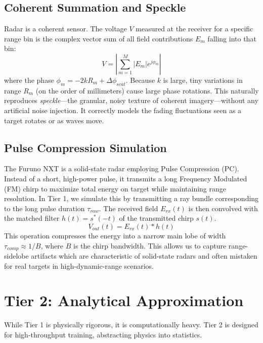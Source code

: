 \documentclass[conf]{new-aiaa}
\begin{document}
\subsection{Coherent Summation and Speckle}
Radar is a coherent sensor. The voltage $V$ measured at the receiver for a specific range bin is the complex vector sum of all field contributions $E_m$ falling into that bin:
\begin{equation}
    V = \left| \sum_{m=1}^{M} |E_m| e^{j \phi_m} \right|
\end{equation}
where the phase $\phi_m = -2 k R_m + \Delta \phi_{scat}$.
Because $k$ is large, tiny variations in range $R_m$ (on the order of millimeters) cause large phase rotations. This naturally reproduces \textit{speckle}—the granular, noisy texture of coherent imagery—without any artificial noise injection. It correctly models the fading fluctuations seen as a target rotates or as waves move.

\subsection{Pulse Compression Simulation}
The Furuno NXT is a solid-state radar employing Pulse Compression (PC). Instead of a short, high-power pulse, it transmits a long Frequency Modulated (FM) chirp to maximize total energy on target while maintaining range resolution. In Tier 1, we simulate this by transmitting a ray bundle corresponding to the long pulse duration $\tau_{raw}$. The received field $E_{rx}(t)$ is then convolved with the matched filter $h(t) = s^*(-t)$ of the transmitted chirp $s(t)$.
\begin{equation}
    V_{out}(t) = E_{rx}(t) * h(t)
\end{equation}
This operation compresses the energy into a narrow main lobe of width $\tau_{comp} \approx 1/B$, where $B$ is the chirp bandwidth. This allows us to capture range-sidelobe artifacts which are characteristic of solid-state radars and often mistaken for real targets in high-dynamic-range scenarios.

\section{Tier 2: Analytical Approximation}
While Tier 1 is physically rigorous, it is computationally heavy. Tier 2 is designed for high-throughput training, abstracting physics into statistics.
\end{document}
